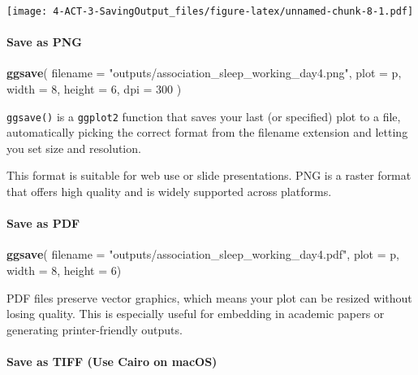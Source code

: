 \documentclass[
]{article}
\newenvironment{Shaded}{\begin{snugshade}}{\end{snugshade}}
\newcommand{\AttributeTok}[1]{\textcolor[rgb]{0.13,0.29,0.53}{#1}}
\newcommand{\DecValTok}[1]{\textcolor[rgb]{0.00,0.00,0.81}{#1}}
\newcommand{\FunctionTok}[1]{\textcolor[rgb]{0.13,0.29,0.53}{\textbf{#1}}}
\newcommand{\NormalTok}[1]{#1}
\newcommand{\StringTok}[1]{\textcolor[rgb]{0.31,0.60,0.02}{#1}}
\begin{document}
\texttt{[image: 4-ACT-3-SavingOutput\_files/figure-latex/unnamed-chunk-8-1.pdf]}

\paragraph{Save as PNG}\label{save-as-png}

\begin{Shaded}
\begin{Highlighting}[]
\FunctionTok{ggsave}\NormalTok{(}
  \AttributeTok{filename =} \StringTok{"outputs/association\_sleep\_working\_day4.png"}\NormalTok{, }
  \AttributeTok{plot =}\NormalTok{ p, }
  \AttributeTok{width =} \DecValTok{8}\NormalTok{, }
  \AttributeTok{height =} \DecValTok{6}\NormalTok{, }
  \AttributeTok{dpi =} \DecValTok{300}
\NormalTok{  )}
\end{Highlighting}
\end{Shaded}

\texttt{ggsave()} is a \texttt{ggplot2} function that saves your last
(or specified) plot to a file, automatically picking the correct format
from the filename extension and letting you set size and resolution.

This format is suitable for web use or slide presentations. PNG is a
raster format that offers high quality and is widely supported across
platforms.

\paragraph{Save as PDF}\label{save-as-pdf}

\begin{Shaded}
\begin{Highlighting}[]
\FunctionTok{ggsave}\NormalTok{(}
  \AttributeTok{filename =} \StringTok{"outputs/association\_sleep\_working\_day4.pdf"}\NormalTok{, }
  \AttributeTok{plot =}\NormalTok{ p, }
  \AttributeTok{width =} \DecValTok{8}\NormalTok{, }
  \AttributeTok{height =} \DecValTok{6}\NormalTok{)}
\end{Highlighting}
\end{Shaded}

PDF files preserve vector graphics, which means your plot can be resized
without losing quality. This is especially useful for embedding in
academic papers or generating printer-friendly outputs.

\paragraph{Save as TIFF (Use Cairo on
macOS)}\label{save-as-tiff-use-cairo-on-macos}
\end{document}
